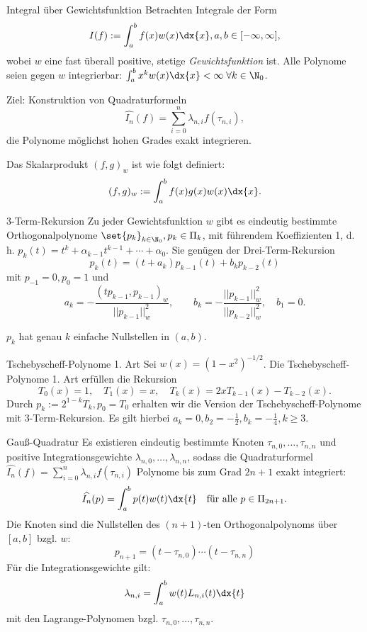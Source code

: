 \begin{karte}{Integral über Gewichtsfunktion}
    Betrachten Integrale der Form 
    \[ I(f) := \int_a^b f(x) w(x) \dx{x}, a,b\in [-\infty, \infty], \]
    wobei \( w \) eine fast überall positive, stetige \textit{Gewichtsfunktion} ist.
    Alle Polynome seien gegen \(w\) integrierbar: \( \int_a^b x^k w(x) \dx{x} < \infty \;\forall k\in \N_0 \).
    
    Ziel: Konstruktion von Quadraturformeln 
    \[ \widehat{I_n}(f) = \sum_{i=0}^n \lambda_{n,i} f(\tau_{n,i}), \]
    die Polynome möglichst hohen Grades exakt integrieren.

    Das Skalarprodukt \((f,g)_w\) ist wie folgt definiert:
    \[ (f,g)_w := \int_a^b f(x) g(x) w(x) \dx{x}. \]
\end{karte}

\begin{karte}{3-Term-Rekursion}
    Zu jeder Gewichtsfunktion \(w\) gibt es eindeutig bestimmte 
    Orthogonalpolynome \( \set{p_k}_{k\in\N_0}, p_k \in \Pi_k \), 
    mit führendem Koeffizienten 1, d. h. \( p_k(t) = t^k + \alpha_{k-1}t^{k-1} + \cdots + \alpha_0 \).
    Sie genügen der Drei-Term-Rekursion 
    \[ p_k(t) = (t + a_k) p_{k-1}(t) + b_k p_{k-2}(t) \]
    mit \( p_{-1} = 0, p_0 = 1 \)  und 
    \[ a_k = -\frac{ (tp_{k-1}, p_{k-1})_w }{ ||p_{k-1}||_w^2 }, \qquad 
    b_k = - \frac{ ||p_{k-1}||_w^2 }{ || p_{k-2} ||_w^2 }, \quad b_1 = 0. \]

    \( p_k \) hat genau \(k\) einfache Nullstellen in \( (a,b) \).
\end{karte}

\begin{karte}{Tschebyscheff-Polynome 1. Art}
    Sei \( w(x) = (1-x^2)^{-1/2} \). 
    Die Tschebyscheff-Polynome 1. Art erfüllen die Rekursion 
    \[ T_0(x) = 1, \quad T_1(x) = x, \quad T_k(x) = 2x T_{k-1}(x) - T_{k-2}(x). \]
    Durch \( p_k := 2^{1-k}T_k, p_0 = T_0 \) erhalten wir die Version der 
    Tschebyscheff-Polynome mit 3-Term-Rekursion. 
    Es gilt hierbei \( a_k = 0, b_2 = -\frac{1}{2}, b_k = -\frac{1}{4}, k \geq 3 \).
\end{karte}

\begin{karte}{Gauß-Quadratur}
    Es existieren eindeutig bestimmte Knoten \( \tau_{n,0}, \ldots, \tau_{n,n} \) 
    und positive Integrationsgewichte \( \lambda_{n,0}, \ldots, \lambda_{n,n} \), 
    sodass die Quadraturformel \( \widehat{I_n}(f) = \sum_{i=0}^n \lambda_{n,i}f(\tau_{n,i}) \)
    Polynome bis zum Grad \( 2n+1 \) exakt integriert:
    \[ \widehat{I_n}(p) = \int_a^b p(t) w(t) \dx{t} \quad \text{für alle } p \in \Pi_{2n+1}. \]
    Die Knoten sind die Nullstellen des \( (n+1) \)-ten Orthogonalpolynoms über 
    \( [a,b] \) bzgl. \(w\): 
    \[ p_{n+1} = (t - \tau_{n,0})\cdots (t - \tau_{n,n}) \] 
    Für die Integrationsgewichte gilt: 
    \[ \lambda_{n,i} = \int_a^b w(t) L_{n,i}(t) \dx{t} \]
    mit den Lagrange-Polynomen bzgl. \( \tau_{n,0}, \ldots, \tau_{n,n} \).
\end{karte}

